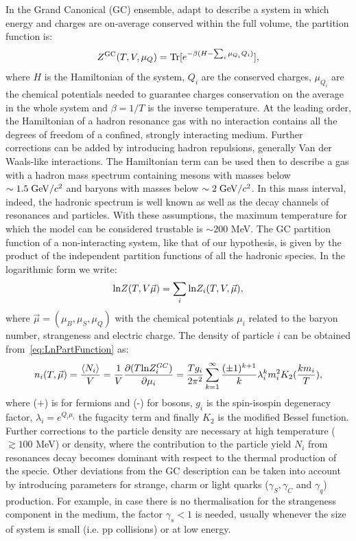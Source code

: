In the Grand Canonical (GC) ensemble, adapt to describe a system in which energy and charges are on-average conserved within the full volume, the partition function is:
\begin{equation}
  \label{eq:PartitionFunction}
Z^{\rm GC} (T, V, \mu_{Q}) = {\rm Tr}[e^{-\beta(H - \sum_{i}{\mu_{Q_{i}}Q_{i}})}],
\end{equation}
where $H$ is the Hamiltonian of the system, $Q_{i}$ are the conserved charges, $\mu_{Q_{i}}$ are the chemical potentials needed to guarantee charges conservation on the average in the whole system and $\beta = 1/T$ is the inverse temperature. At the leading order, the Hamiltonian of a hadron resonance gas with no interaction contains all the degrees of freedom of a confined, strongly interacting medium. Further corrections can be added by introducing hadron repulsions, generally Van der Waals-like interactions. The Hamiltonian term can be used then to describe a gas with a hadron mass spectrum containing mesons with masses below $\sim 1.5 \; \mathrm{GeV}/c^{2}$ and baryons with masses below $\sim 2\; \mathrm{GeV}/c^{2}$. In this mass interval, indeed, the hadronic spectrum is well known as well as the decay channels of resonances and particles. With these assumptions, the maximum temperature for which the model can be considered trustable is $\sim 200$ MeV. The GC partition function of a non-interacting system, like that of our hypothesis, is given by the product of the independent partition functions of all the hadronic species. In the logarithmic form we write:
\begin{equation}
  \label{eq:LnPartFunction}
{\rm ln} Z(T, V \vec{\mu}) = \sum_{i} {\rm ln} Z_{i} (T, V, \vec{\mu}),
\end{equation}
where $\vec{\mu} = (\mu_B, \mu_S, \mu_Q)$ with the chemical potentials $\mu_i$ related to the baryon number, strangeness and electric charge.
The density of particle $i$ can be obtained from~\ref{eq:LnPartFunction} as:
\begin{equation}
\label{eq:ParticleDensity}
n_{i} (T, \vec{\mu}) = \frac{\langle N_{i} \rangle}{V} = \frac{1}{V}\frac{\partial (T {\rm ln}Z_i^{GC})}{\partial \mu_i} = \frac{T g_{i}}{2\pi^{2}} \sum_{k=1}^{\infty} \frac{(\pm 1)^{k+1}}{k} \lambda_{i}^{k} m_{i}^{2}K_{2}(\frac{km_{i}}{T}),
\end{equation}
where (+) is for fermions and (-) for bosons, $g_{i}$ is the spin-isospin degeneracy factor, $\lambda_{i} = e^{Q_{i}\mu_{i}}$ the fugacity term and finally $K_{2}$ is the modified Bessel function.
Further corrections to the particle density are necessary at high temperature ($\gtrsim 100 $ MeV) or density, where the contribution to the particle yield $N_{i}$ from resonances decay becomes dominant with respect to the thermal production of the specie. Other deviations from the GC description can be taken into account by introducing parameters for strange, charm or light quarks ($\gamma_{S}, \gamma_{C}$ and $\gamma_{q}$) production. For example, in case there is no thermalisation for the strangeness component in the medium, the factor $\gamma_{s}<1$ is needed, usually whenever the size of system is small (i.e. pp collisions) or at low energy. 
